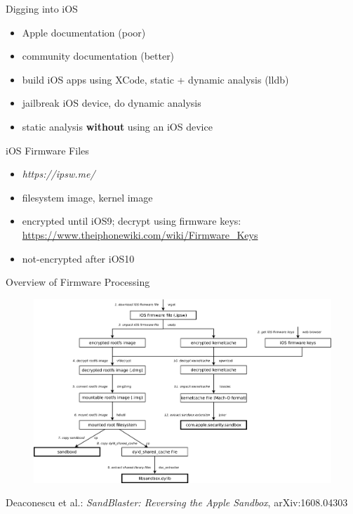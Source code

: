 \documentclass{simple}
\begin{document}
\begin{frame}{Digging into iOS}
  \begin{itemize}
    \pause \item Apple documentation (poor)
    \pause \item community documentation (better)
    \pause \item build iOS apps using XCode, static + dynamic analysis (lldb)
    \pause \item jailbreak iOS device, do dynamic analysis
    \pause \item static analysis \textbf{without} using an iOS device
  \end{itemize}
\end{frame}

\begin{frame}{iOS Firmware Files}
  \begin{itemize}
    \item \textit{https://ipsw.me/}
    \item filesystem image, kernel image
    \item encrypted until iOS9; decrypt using firmware keys: \url{https://www.theiphonewiki.com/wiki/Firmware_Keys}
    \item not-encrypted after iOS10
  \end{itemize}
\end{frame}

\begin{frame}{Overview of Firmware Processing}
  \begin{figure}
    \centering
    \includegraphics[width=\textwidth]{img/extract-required-files}
  \end{figure}
  \vspace{0.2cm}
  \centering
  \footnotesize{Deaconescu et al.: \textit{SandBlaster: Reversing the Apple Sandbox}, arXiv:1608.04303}
\end{frame}
\end{document}
